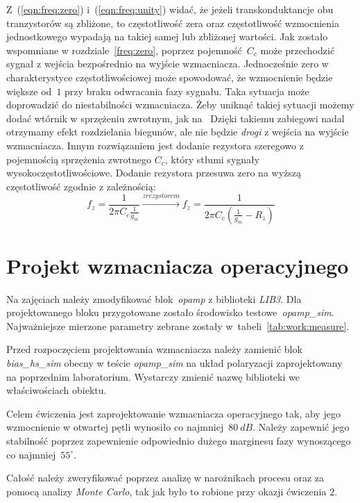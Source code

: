 \documentclass[twoside,pl,final]{labman}
\begin{document}
Z~(\ref{eqn:freq:zero}) i~(\ref{eqn:freq:unity}) widać,
że jeżeli transkonduktancje obu tranzystorów są zbliżone, to
częstotliwość zera oraz częstotliwość wzmocnienia jednostkowego
wypadają na takiej samej lub zbliżonej wartości.
Jak zostało wspomniane w rozdziale~\ref{freq:zero},
poprzez pojemność~$C_c$ może przechodzić sygnał z wejścia
bezpośrednio na wyjście wzmacniacza.
Jednocześnie zero w charakterystyce częstotliwościowej może spowodować,
że wzmocnienie będzie większe od~$1$ przy braku odwracania fazy sygnału.
Taka sytuacja może doprowadzić do niestabilności wzmacniacza.
Żeby uniknąć takiej sytuacji możemy dodać wtórnik w sprzężeniu zwrotnym,
jak na~
Dzięki takiemu zabiegowi nadal otrzymamy efekt rozdzielania biegunów,
ale nie będzie \emph{drogi} z wejścia na wyjście wzmacniacza.
Innym rozwiązaniem jest dodanie rezystora szeregowo z pojemnością sprzężenia
zwrotnego $C_c$, który stłumi sygnały wysokoczęstotliwościowe.
Dodanie rezystora przesuwa zero na wyższą częstotliwość
zgodnie z zależnością:
\begin{equation}
  f_z = \frac{1}{2 \pi C_c \frac{1}{g_m}} \xrightarrow{z rezystorem}
  f_z = \frac{1}{2 \pi C_c (\frac{1}{g_m} - R_z)}
\end{equation}

\chapter{Projekt wzmacniacza operacyjnego}
\label{work}
Na zajęciach należy zmodyfikować blok~\emph{opamp}
z biblioteki \emph{LIB3}.
Dla projektowanego bloku przygotowane zostało
środowisko testowe~\emph{opamp\_sim}.
Najważniejsze mierzone parametry zebrane
zostały w~tabeli~\ref{tab:work:measure}.

Przed rozpoczęciem projektowania wzmacniacza należy zamienić blok
\emph{bias\_hs\_sim} obecny w teście \emph{opamp\_sim}
na układ polaryzacji zaprojektowany na poprzednim laboratorium.
Wystarczy zmienić nazwę biblioteki we właściwościach obiektu.

Celem ćwiczenia jest zaprojektowanie wzmacniacza operacyjnego tak,
aby jego wzmocnienie w otwartej pętli wynosiło co najmniej~$80~dB$.
Należy zapewnić jego stabilność poprzez zapewnienie odpowiednio
dużego marginesu fazy wynoszącego co najmniej~$55^\circ$.

Całość należy zweryfikować poprzez analizę w narożnikach procesu
oraz za pomocą analizy \emph{Monte Carlo},
tak jak było to robione przy okazji ćwiczenia 2.
\end{document}
